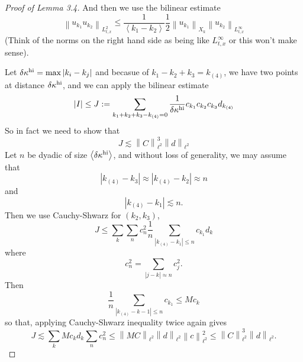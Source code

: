 \documentclass{article}
\newcommand\norm[1]{\left\lVert#1\right\rVert}
\begin{document}
\begin{proof}[Proof of Lemma 3.4]
  And then we use the bilinear estimate
  \begin{equation*}
    \norm{u_{k_{1}}u_{k_{2}}}_{L^{2}_{t,x}} \leq  \frac{1}{\left\langle   k_{1}-k_{2}\right\rangle} \frac{1}{2} \norm{u_{k_{1}}}_{X_{k}}\norm{u_{k_{2}}}_{L^{\infty}_{t,x}}
  \end{equation*}
  (Think of the norms on the right hand side as being like $L^{\infty}_{t,x}$ or
  this won't make sense).

  Let $\delta \kappa^{\rm hi} = \max \left| k_{i}-k_{j} \right|$ and becasue of
  $k_{1}-k_{2}+k_{3}= k_{(4)}$, we have two points at distance
  $\delta \kappa^{\rm hi}$, and we can apply the bilinear estimate
  \begin{equation*}
    |I| \leq J:= \sum_{k_{1}+k_{2}+k_{3}-k_{(4)}=0}\frac{1}{\delta\kappa^{\rm hi}} c_{k_{1}}c_{k_{2}}c_{k_{3}}d_{k_{(4)}}
  \end{equation*}
  So in fact we need to show that
  \begin{equation*}
    J \lesssim \norm{C}_{\ell^{2}}^{3}\norm{d}_{\ell^{2}}
  \end{equation*}
  Let $n$ be dyadic of size $\left\langle \delta\kappa^{\rm hi} \right\rangle$,
  and without loss of generality, we may assume that
  \begin{equation*}
    \left| k_{(4)}-k_{3} \right|
    \approx
    \left| k_{(4)}-k_{2} \right|
    \approx
    n
  \end{equation*}
  and
  \begin{equation*}
    \left| k_{(4)}-k_{1} \right|
    \lesssim n.
  \end{equation*}
  Then we use Cauchy-Shwarz for $(k_{2},k_{3})$,
  \begin{equation*}
    J \leq \sum_{k}\sum_{n}c_{n}^{2}\frac{1}{n}\sum_{\left| k_{(4)}-k_{1} \right| \leq n} c_{k_{1}}d_{k}   
  \end{equation*}
  where 
  \begin{equation*}
    c_{n}^{2} = \sum_{|j-k|\approx n}c_{j}^{2}.
  \end{equation*}
  Then
  \begin{equation*}
    \frac{1}{n}\sum_{\left| k_{(4)}-k-1 \right| \leq  n} c_{k_{1}} \leq Mc_{k}
  \end{equation*}
  so that, applying Cauchy-Shwarz inequality twice again gives
  \begin{equation*}
    J 
    \lesssim \sum_{k}M c_{k}d_{k}\sum_{n}c_{n}^{2} 
    \leq \norm{MC}_{\ell^{2}}\norm{d}_{\ell^{2}}\norm{c}_{\ell^{2}}^{2}
    \leq \norm{C}_{\ell^{2}}^{3}\norm{d}_{\ell^{2}}.
  \end{equation*}
\end{proof}
\end{document}
